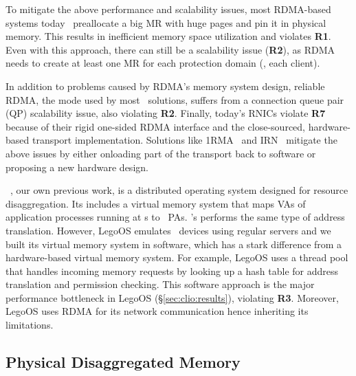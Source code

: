 To mitigate the above performance and scalability issues, most RDMA-based systems today~\cite{FaRM,Tsai17-SOSP} 
preallocate a big MR with huge pages and pin it in physical memory.
This results in inefficient memory space utilization and violates \textbf{R1}.
Even with this approach, there can still be a scalability issue (\textbf{R2}),
as RDMA needs to create at least one MR for each protection domain (\ie, each client).

In addition to problems caused by RDMA's memory system design, reliable RDMA, the mode used by most \md\ solutions, suffers from a connection queue pair (QP) scalability issue, also violating \textbf{R2}.
Finally, today's RNICs violate \textbf{R7} because of their rigid one-sided RDMA interface and the close-sourced, hardware-based transport implementation.
Solutions like 1RMA~\cite{1RMA} and IRN~\cite{IRN} mitigate the above issues by either onloading part of the transport back to software or proposing a new hardware design.

~\cite{Shan18-OSDI}, our own previous work, is a distributed operating system designed for resource disaggregation.
Its \MN{} includes a virtual memory system that maps VAs of application processes running at \CN{}s to \MN\ PAs. \sys's \MN{} performs the same type of address translation.
However, LegoOS emulates \MN\ devices using regular servers and we built its virtual memory system in software,
which has a stark difference from a hardware-based virtual memory system. 
For example, LegoOS uses a thread pool that handles incoming memory requests by looking up a hash table for address translation and permission checking.
This software approach is the major performance bottleneck in LegoOS (\S\ref{sec:clio:results}),
violating \textbf{R3}.
Moreover, LegoOS %
uses RDMA for its network communication hence inheriting its limitations.

\subsection{Physical Disaggregated Memory}
\label{sec:clio:pdm}


